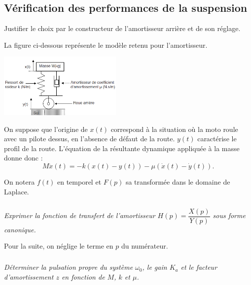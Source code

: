 \documentclass[10pt,fleqn]{article} %
\begin{document}
\begin{multicols}{2}
\subsection*{Vérification des performances de la suspension}

\begin{obj}
Justifier le choix par le constructeur de l’amortisseur arrière et de son réglage.
\end{obj}

La figure ci-dessous représente %
 le modèle retenu pour l'amortisseur. 

\begin{center}
       \includegraphics[width=6cm]{images/fig_05}
\end{center}

On suppose que l’origine de $x(t)$ correspond à la situation où la moto roule avec un pilote dessus, en l’absence de défaut de la route. $y(t)$ caractérise le profil de la route.
L’équation de la résultante dynamique appliquée à la masse donne donc :
$$M\ddot{x}(t)= - k\left(x(t)-y(t)\right) -\mu \left(\dot{x}(t)-\dot{y}(t) \right).$$

On notera $f(t)$ en temporel et $F(p)$ sa transformée dans le domaine de Laplace.



\subparagraph{}
\textit{Exprimer la fonction de transfert de l’amortisseur $H(p)=\dfrac{X(p)}{Y(p)}$
sous forme canonique.}
\ifprof
\begin{corrige}
\end{corrige}
\else
\fi

Pour la suite, on néglige le terme en $p$ du numérateur.


\subparagraph{}
\textit{Déterminer la pulsation propre du système $\omega_0$, le gain $K_a$ et le facteur d’amortissement $z$ en
fonction de $M$, $k$ et $\mu$.}
\ifprof
\begin{corrige}
\end{corrige}
\else
\fi


\end{multicols}
\end{document}
